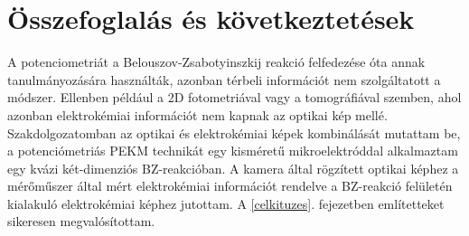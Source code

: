 \chapter{Összefoglalás és következtetések}
\pagestyle{headings}
A potenciometriát a Belouszov-Zsabotyinszkij reakció felfedezése óta annak tanulmányozására használták, azonban térbeli információt nem szolgáltatott a módszer. Ellenben például a 2D fotometriával vagy a tomográfiával szemben, ahol azonban elektrokémiai információt nem kapnak az optikai kép mellé. Szakdolgozatomban az optikai és elektrokémiai képek kombinálását mutattam be, a potenciómetriás PEKM technikát egy  kisméretű mikroelektróddal alkalmaztam  egy kvázi két-dimenziós BZ-reakcióban. A kamera által rögzített optikai képhez a mérőműszer által mért elektrokémiai információt rendelve a BZ-reakció felületén kialakuló elektrokémiai képhez jutottam.
A \ref{celkituzes}. fejezetben említetteket sikeresen megvalósítottam.